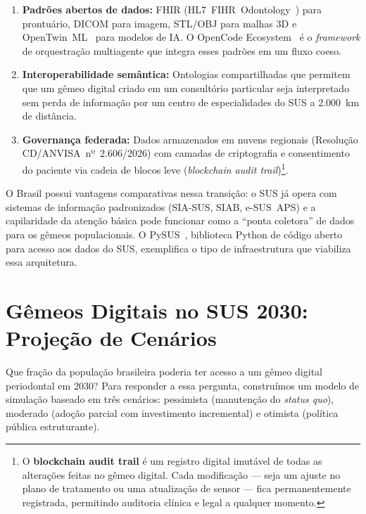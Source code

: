 \begin{enumerate}
    \item \textbf{Padrões abertos de dados:} FHIR
        (HL7~FIHR~Odontology~\cite{robles2023opentwins}) para
        prontuário, DICOM para imagem, STL/OBJ para malhas 3D e
        OpenTwin~ML~\cite{infante2024integrating} para modelos de
        IA. O OpenCode Ecosystem~\cite{opencode2026ecosystem} é o
        \textit{framework} de orquestração multiagente que integra
        esses padrões em um fluxo coeso.
    \item \textbf{Interoperabilidade semântica:} Ontologias
        compartilhadas que permitem que um gêmeo digital criado em
        um consultório particular seja interpretado sem perda de
        informação por um centro de especialidades do SUS a
        2.000~km de distância.
    \item \textbf{Governança federada:} Dados armazenados em nuvens
        regionais (Resolução CD/ANVISA~nº~2.606/2026) com camadas
        de criptografia e consentimento do paciente via cadeia de
        blocos leve (\textit{blockchain audit trail})\footnote{O
        \textbf{blockchain audit trail} é um registro digital
        imutável de todas as alterações feitas no gêmeo digital.
        Cada modificação — seja um ajuste no plano de tratamento ou
        uma atualização de sensor — fica permanentemente registrada,
        permitindo auditoria clínica e legal a qualquer momento.}.
\end{enumerate}

O Brasil possui vantagens comparativas nessa transição: o SUS já
opera com sistemas de informação padronizados (SIA-SUS, SIAB,
e-SUS~APS) e a capilaridade da atenção básica pode funcionar como
a ``ponta coletora'' de dados para os gêmeos populacionais. O
PySUS~\cite{pysus2026}, biblioteca Python de código aberto para
acesso aos dados do SUS, exemplifica o tipo de infraestrutura que
viabiliza essa arquitetura.


\section{Gêmeos Digitais no SUS 2030: Projeção de Cenários}

Que fração da população brasileira poderia ter acesso a um gêmeo
digital periodontal em 2030? Para responder a essa pergunta,
construímos um modelo de simulação baseado em três cenários:
pessimista (manutenção do \textit{status quo}), moderado (adoção
parcial com investimento incremental) e otimista (política pública
estruturante).

